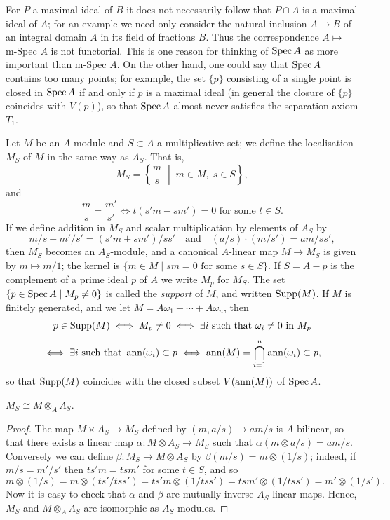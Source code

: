 \begin{remark}
For $P$ a maximal ideal of $B$ it does not necessarily follow that
$P \cap A$ is a maximal ideal of $A$; for an example we need only consider the
natural inclusion $A \to B$ of an integral domain $A$ in its field of fractions
$B$. Thus the correspondence $A \mapsto$ m-Spec $A$ is not functorial. This is one
reason for thinking of $\operatorname{Spec} A$ as more important than m-Spec $A$. On the
other hand, one could say that $\operatorname{Spec} A$ contains too many points; for
example, the set $\{p\}$ consisting of a single point is closed in $\operatorname{Spec} A$ if and
only if $p$ is a maximal ideal (in general the closure of $\{p\}$ coincides with
$V(p)$), so that $\operatorname{Spec} A$ almost never satisfies the separation axiom $T_1$.
\end{remark}

Let $M$ be an $A$-module and $S \subset A$ a multiplicative set; we define the
localisation $M_S$ of $M$ in the same way as $A_S$. That is,
\[
  M_S = \left\{\frac{m}{s} \;\middle|\; m \in M, \; s \in S\right\},
\]
and
\[
  \frac{m}{s} = \frac{m'}{s'} \iff t(s'm - sm') = 0 \text{ for some } t \in S.
\]
If we define addition in $M_S$ and scalar multiplication by elements
of $A_S$ by
\[
  m/s + m'/s' = (s'm + sm')/ss' \quad \text{and} \quad (a/s) \cdot (m/s') = am/ss',
\]
then $M_S$ becomes an $A_S$-module, and a canonical $A$-linear map $M \to M_S$
is given by $m \mapsto m/1$; the kernel is $\{m \in M \mid sm = 0 \text{ for some } s \in S\}$. If $S =
A - p$ is the complement of a prime ideal $p$ of $A$ we write $M_p$ for $M_S$. The set
$\{p \in \operatorname{Spec} A \mid M_p \neq 0\}$ is called the \emph{support} of $M$, and written $\operatorname{Supp}(M)$. If $M$ is
finitely generated, and we let $M = A\omega_1 + \cdots + A\omega_n$, then
\[
  p \in \operatorname{Supp}(M) \iff M_p \neq 0 \iff \exists i \text{ such that } \omega_i \neq 0 \text{ in } M_p
\]
\[
  \iff \exists i \text{ such that } \operatorname{ann}(\omega_i) \subset p \iff \operatorname{ann}(M) = \bigcap_{i=1}^{n} \operatorname{ann}(\omega_i) \subset p,
\]
so that $\operatorname{Supp}(M)$ coincides with the closed subset $V(\operatorname{ann}(M))$ of $\operatorname{Spec} A$.

\begin{theorem}\label{thm:4.4}
$M_S \cong M \otimes_A A_S$.
\end{theorem}

\begin{proof}
The map $M \times A_S \to M_S$ defined by $(m, a/s) \mapsto am/s$ is $A$-bilinear,
so that there exists a linear map $\alpha\colon M \otimes A_S \to M_S$ such that $\alpha(m \otimes a/s) =
am/s$. Conversely we can define $\beta\colon M_S \to M \otimes A_S$ by $\beta(m/s) = m \otimes (1/s)$;
indeed, if $m/s = m'/s'$ then $ts'm = tsm'$ for some $t \in S$, and so
\[
  m \otimes (1/s) = m \otimes (ts'/tss') = ts'm \otimes (1/tss') = tsm' \otimes (1/tss')
                 = m' \otimes (1/s').
\]
Now it is easy to check that $\alpha$ and $\beta$ are mutually inverse $A_S$-linear
maps. Hence, $M_S$ and $M \otimes_A A_S$ are isomorphic as $A_S$-modules.
\end{proof}

